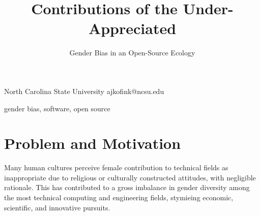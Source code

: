 \documentclass{sigplanconf}
\begin{document}
\setlength{\pdfpageheight}{\paperheight}
\setlength{\pdfpagewidth}{\paperwidth}






\title{Contributions of the Under-Appreciated}
\subtitle{Gender Bias in an Open-Source Ecology}

           {North Carolina State University}
           {ajkofink@ncsu.edu}

\maketitle

\begin{abstract}
\end{abstract}



\keywords
gender bias, software, open source

\section{Problem and Motivation}
Many human cultures perceive female contribution to technical
fields as inappropriate due to religious or culturally constructed attitudes, with
negligible rationale. This has contributed to a gross imbalance in gender diversity among
the most technical computing and engineering fields, stymieing economic,
scientific, and innovative pursuits.
\end{document}
